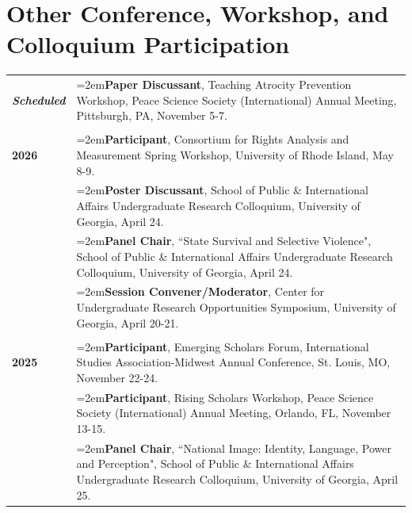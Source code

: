 \documentclass[letterpaper,12pt]{article}
\begin{document}
\section{Other Conference, Workshop, and Colloquium Participation}
\begin{xltabular}{\dimexpr\textwidth-0in}{p{1.5in}X}

\textbf{\textit{Scheduled}} 	& \hangindent=2em\textbf{Paper Discussant}, Teaching Atrocity Prevention Workshop, Peace Science \mbox{Society} (International) Annual Meeting, Pittsburgh, PA, November 5-7.\\ \\

\textbf{2026} 			& \hangindent=2em\textbf{Participant}, Consortium for Rights Analysis and Measurement Spring Workshop, University of Rhode Island, May 8-9.\\

                     			& \hangindent=2em\textbf{Poster Discussant}, School of Public \& International Affairs Undergraduate \mbox{Research} Colloquium, University of \mbox{Georgia}, April 24.\\
                     
                     			& \hangindent=2em\textbf{Panel Chair}, ``State Survival and Selective Violence", School of Public \& \mbox{International} Affairs Undergraduate Research Colloquium, University of \mbox{Georgia}, April 24.\\
			
                     			& \hangindent=2em\textbf{Session Convener/Moderator}, Center for Undergraduate Research \mbox{Opportunities} \mbox{Symposium}, University of Georgia, April 20-21.\\ \\
                     
\textbf{2025} 			& \hangindent=2em\textbf{Participant}, Emerging Scholars Forum, International Studies Association-Midwest Annual Conference, St. Louis, MO, November 22-24.\\
                     			
					& \hangindent=2em\textbf{Participant}, Rising Scholars Workshop, Peace Science Society (International) \mbox{Annual} Meeting, Orlando, FL, November 13-15.\\
					
                     			& \hangindent=2em\textbf{Panel Chair}, ``National Image: Identity, Language, Power and Perception", School of \mbox{Public} \& International Affairs Undergraduate Research Colloquium, University of \mbox{Georgia}, April 25.\\
			

\end{xltabular}
\end{document}
